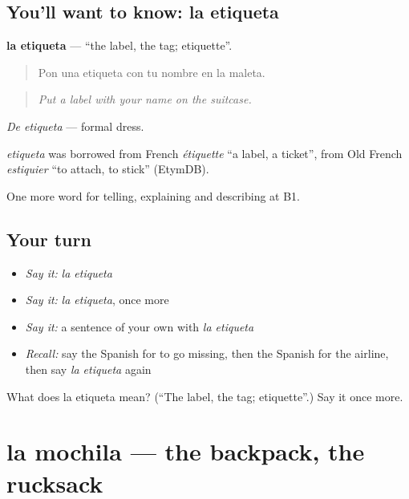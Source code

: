 \subsection*{You'll want to know: la etiqueta}
\textbf{la etiqueta} — \textquotedblleft{}the label, the tag; etiquette\textquotedblright{}.

\begin{quote}
Pon una etiqueta con tu nombre en la maleta.
\end{quote}

\begin{quote}
\emph{Put a label with your name on the suitcase.}
\end{quote}

\emph{De etiqueta} — formal dress.

\begin{cousinweb}
\emph{etiqueta} was borrowed from French \emph{étiquette} \textquotedblleft{}a label, a ticket\textquotedblright{}, from Old French \emph{estiquier} \textquotedblleft{}to attach, to stick\textquotedblright{} (EtymDB).
\end{cousinweb}

\begin{grammarlens}[title={What you've built}]
One more word for telling, explaining and describing at B1.
\end{grammarlens}

\subsection*{Your turn}
\begin{itemize}
\raggedright
  \item \emph{Say it:} \emph{la etiqueta}
  \item \emph{Say it:} \emph{la etiqueta}, once more
  \item \emph{Say it:} a sentence of your own with \emph{la etiqueta}
  \item \emph{Recall:} say the Spanish for to go missing, then the Spanish for the airline, then say \emph{la etiqueta} again
\end{itemize}

\begin{tcolorbox}[breakable,colback=teal!4,colframe=teal!35!black,title={Before you move on}]
What does la etiqueta mean? (\textquotedblleft{}The label, the tag; etiquette\textquotedblright{}.) Say it once more.
\end{tcolorbox}
\section[la mochila]{la mochila — the backpack, the rucksack}

